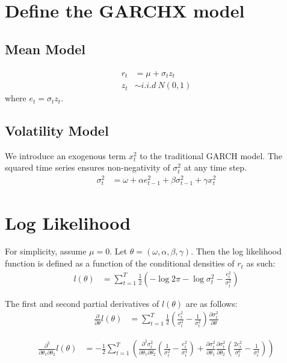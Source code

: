 \documentclass{article}
\begin{document}
\section{Define the GARCHX model}

\subsection{Mean Model}
\begin{align}
    r_t &= \mu + \sigma_t z_t \\
    z_t &\sim i.i.d\ N(0, 1)
\end{align}
where $e_t = \sigma_t z_t$.

\subsection{Volatility Model}
We introduce an exogenous term $x_t^2$ to the traditional GARCH model. The squared time series ensures non-negativity of $\sigma_t^2$ at any time step.
\begin{align}
    \sigma_t^2 &= \omega + \alpha e_{t-1}^2 + \beta \sigma_{t-1}^2 + \gamma x_t^2
\end{align}


\section{Log Likelihood}
For simplicity, assume $\mu=0$. Let $\theta = (\omega, \alpha, \beta, \gamma)$. Then the log likelihood function is defined as a function of the conditional densities of $r_t$ as such: 
\begin{align}
    l(\theta) &=  \sum_{t=1}^T \frac{1}{2} \left(-\log{2\pi} -\log{\sigma_t^2} - \frac{e_t^2}{\sigma_t^2} \right)
\end{align}

The first and second partial derivatives of $l(\theta)$ are as follows:
\begin{align}
    \frac{\partial }{\partial \theta} l(\theta) &=  \sum_{t=1}^T \frac{1}{2} \left(\frac{e_t^2}{\sigma_t^4} - \frac{1}{\sigma_t^2}\right) \frac{\partial \sigma_t^2}{\partial \theta}
\end{align}

\begin{align}
    \frac{\partial^2 }{\partial \theta_1 \partial \theta_2} l(\theta) &= - \frac{1}{2} \sum_{t=1}^T \left( \frac{\partial^2 \sigma_t^2}{\partial \theta_1 \partial \theta_2} \left(\frac{1}{\sigma_t^2} - \frac{e_t^2}{\sigma_t^4}\right) + \frac{\partial \sigma_t^2}{\partial \theta_1} \frac{\partial \sigma_t^2}{\partial \theta_2} \left(\frac{2e_t^2}{\sigma_t^6} - \frac{1}{\sigma_t^4}\right) \right) 
\end{align}
\end{document}
